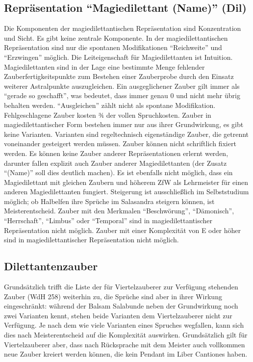 \subsection{Repräsentation \enquote{Magiedilettant (Name)} (Dil)}
Die Komponenten der magiedilettantischen Repräsentation sind Konzentration und Sicht. Es gibt keine zentrale Komponente. In der magiedilettantischen Repräsentation sind nur die spontanen Modifikationen \enquote{Reichweite} und \enquote{Erzwingen} möglich. Die Leiteigenschaft für Magiedilettanten ist Intuition. Magiedilettanten sind in der Lage eine bestimmte Menge fehlender Zauberfertigkeitspunkte zum Bestehen einer Zauberprobe durch den Einsatz weiterer Astralpunkte auszugleichen. Ein ausgeglichener Zauber gilt immer als \enquote{gerade so geschafft}, was bedeutet, dass immer genau \SI{0}{\ZfPstern} und nicht mehr übrig behalten werden. \enquote{Ausgleichen} zählt nicht als spontane Modifikation. Fehlgeschlagene Zauber kosten ¾ der vollen Spruchkosten. Zauber in magiedilettantischer Form bestehen immer nur aus ihrer Grundwirkung, es gibt keine Varianten. Varianten sind regeltechnisch eigenständige Zauber, die getrennt voneinander gesteigert werden müssen. Zauber können nicht schriftlich fixiert werden. Es können keine Zauber anderer Repräsentationen erlernt werden, darunter fallen explizit auch Zauber anderer Magiedilettanten (der Zusatz \enquote{(Name)} soll dies deutlich machen). Es ist ebenfalls nicht möglich, dass ein Magiedilettant mit gleichen Zaubern und höherem ZfW als Lehrmeister für einen anderen Magiedilettanten fungiert. Steigerung ist ausschließlich im Selbststudium möglich; ob Halbelfen ihre Sprüche im Salasandra steigern können, ist Meisterentscheid. Zauber mit den Merkmalen \enquote{Beschwörung}, \enquote{Dämonisch}, \enquote{Herrschaft}, \enquote{Limbus} oder \enquote{Temporal} sind in magiedilettantischer Repräsentation nicht möglich. Zauber mit einer Komplexität von E oder höher sind in magiedilettantischer Repräsentation nicht möglich.

\subsection{Dilettantenzauber}
Grundsätzlich trifft die Liste der für Viertelzauberer zur Verfügung stehenden Zauber (WdH 258) weiterhin zu, die Sprüche sind aber in ihrer Wirkung eingeschränkt: während der Balsam Salabunde neben der Grundwirkung noch zwei Varianten kennt, stehen beide Varianten dem Viertelzauberer nicht zur Verfügung. Je nach dem wie viele Varianten eines Spruches wegfallen, kann sich dies nach Meisterentscheid auf die Komplexität auswirken. Grundsätzlich gilt für Viertelzauberer aber, dass nach Rücksprache mit dem Meister auch vollkommen neue Zauber kreiert werden können, die kein Pendant im Liber Cantiones haben.

